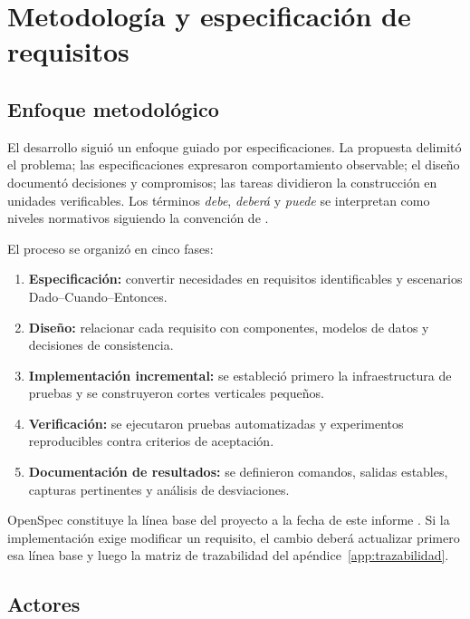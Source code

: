 \chapter{Metodología y especificación de requisitos}
\label{chap:metodologia}

\section{Enfoque metodológico}

El desarrollo siguió un enfoque guiado por especificaciones. La propuesta delimitó el problema; las especificaciones expresaron comportamiento observable; el diseño documentó decisiones y compromisos; las tareas dividieron la construcción en unidades verificables. Los términos \emph{debe}, \emph{deberá} y \emph{puede} se interpretan como niveles normativos siguiendo la convención de \textcite{rfc2119}.

El proceso se organizó en cinco fases:

\begin{enumerate}
  \item \textbf{Especificación:} convertir necesidades en requisitos identificables y escenarios Dado--Cuando--Entonces.
  \item \textbf{Diseño:} relacionar cada requisito con componentes, modelos de datos y decisiones de consistencia.
  \item \textbf{Implementación incremental:} se estableció primero la infraestructura de pruebas y se construyeron cortes verticales pequeños.
  \item \textbf{Verificación:} se ejecutaron pruebas automatizadas y experimentos reproducibles contra criterios de aceptación.
  \item \textbf{Documentación de resultados:} se definieron comandos, salidas estables, capturas pertinentes y análisis de desviaciones.
\end{enumerate}

OpenSpec constituye la línea base del proyecto a la fecha de este informe \parencite{proyectoOpenSpec}. Si la implementación exige modificar un requisito, el cambio deberá actualizar primero esa línea base y luego la matriz de trazabilidad del apéndice~\ref{app:trazabilidad}.

\section{Actores}

